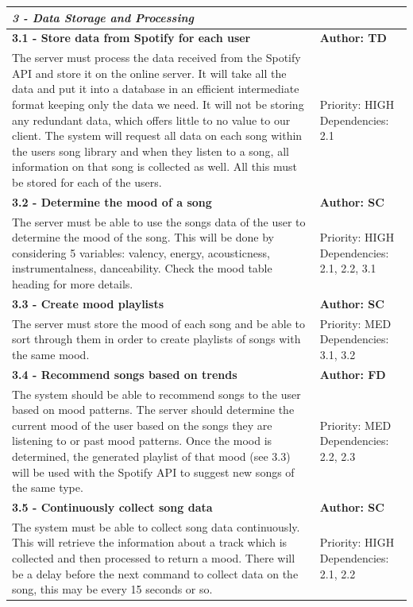 \documentclass[11pt]{report}
\begin{document}
\begin{center}
\begin{longtable}{| p{13cm} | p{3cm} |}
\multicolumn{2}{|l|}{\textbf{\textit{3 - Data Storage and Processing}}} \\
\hline
\textbf{3.1 - Store data from Spotify for each user} & \textbf{Author: TD} \\
\hline
The server must process the data received from the Spotify API and store it on the online server. It will take all the data and put it into a database in an efficient intermediate format keeping only the data we need. It will not be storing any redundant data, which offers little to no value to our client. The system will request all data on each song within the users song library and when they listen to a song, all information on that song is collected as well. All this must be stored for each of the users. & Priority: HIGH Dependencies: 2.1 \\
\hline
\textbf{3.2 - Determine the mood of a song} & \textbf{Author: SC} \\
\hline
The server must be able to use the songs data of the user to determine the mood of the song. This will be done by considering 5 variables: valency, energy, acousticness, instrumentalness, danceability. Check the mood table heading for more details. &  Priority: HIGH Dependencies: 2.1, 2.2, 3.1\\
\hline
\textbf{3.3 - Create mood playlists} & \textbf{Author: SC} \\
\hline
The server must store the mood of each song and be able to sort through them in order to create playlists of songs with the same mood. &  Priority: MED Dependencies: 3.1, 3.2\\
\hline
\textbf{3.4 - Recommend songs based on trends} & \textbf{Author: FD} \\
\hline
The system should be able to recommend songs to the user based on mood patterns. The server should determine the current mood of the user based on the songs they are listening to or past mood patterns. Once the mood is determined, the generated playlist of that mood (see 3.3) will be used with the Spotify API to suggest new songs of the same type. &  Priority: MED Dependencies: 2.2, 2.3\\
\hline
\textbf{3.5 - Continuously collect song data} & \textbf{Author: SC} \\
\hline
The system must be able to collect song data continuously. This will retrieve the information about a track which is collected and then processed to return a mood. There will be a delay before the next command to collect data on the song, this may be every 15 seconds or so. &  Priority: HIGH Dependencies: 2.1, 2.2\\
\hline



\end{longtable}
\end{center}
\end{document}
